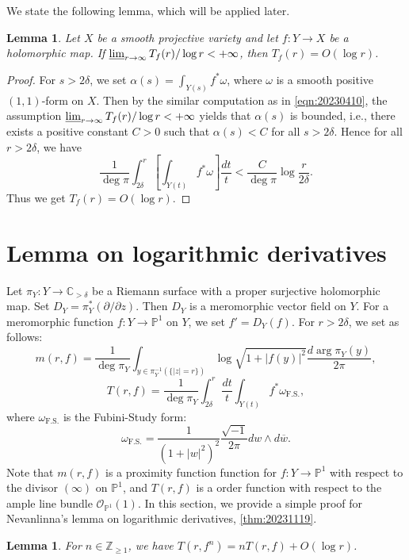 \documentclass[11pt,english]{smfart}
\theoremstyle{plain}
\newtheorem{lem}[thm]{Lemma}
\theoremstyle{definition}
\theoremstyle{remark}
\numberwithin{equation}{section}
\theoremstyle{plain}
\begin{document}
We state the following lemma, which will be applied later.
	
	\begin{lem}\label{lem:20230415}
		Let $X$ be a smooth projective variety and let $f:Y\to X$ be a holomorphic map.
		If $\varliminf_{r\to\infty}T_f(r)/\log r<+\infty$, then $T_f(r)=O(\log r)$.
	\end{lem}
	
	
	\begin{proof}
		For $s>2\delta$, we set $\alpha(s)=\int_{Y(s)}f^*\omega$, where $\omega$ is a smooth positive $(1,1)$-form on $X$.
		Then by the similar computation as in \eqref{eqn:20230410}, the assumption $\varliminf_{r\to\infty}T_f(r)/\log r<+\infty$ yields that $\alpha(s)$ is bounded, i.e., there exists a positive constant $C>0$ such that $\alpha(s)<C$ for all $s>2\delta$.
		Hence for all $r>2\delta$, we have
		$$
		\frac{1}{\operatorname{deg} \pi} \int_{2\delta}^{r}\left[\int_{Y(t)} f^{*}\omega\right] \frac{d t}{t}<\frac{C}{\operatorname{deg} \pi}\log \frac{r}{2\delta}.
		$$
		Thus we get $T_f(r)=O(\log r)$.
	\end{proof}
	
	
	
	\section{Lemma on logarithmic derivatives} \label{sec:20250904}
	Let $\pi _Y:Y\to \mathbb C_{>\delta}$ be a Riemann surface with a proper surjective holomorphic map.
	Set $D_Y=\pi_Y^*(\partial /\partial z)$.
	Then $D_Y$ is a meromorphic vector field on $Y$.
	For a meromorphic function $f:Y\to\mathbb P^1$ on $Y$, we set $f'=D_Y(f)$.
	For $r>2\delta$, we set as follows:
	$$
	m(r,f)=\frac{1}{\deg \pi_Y}\int_{y\in \pi_Y^{-1}(\{|z|=r\})}\log \sqrt{1+|f(y)|^2}\frac{d\arg \pi_Y(y)}{2\pi},
	$$
	$$
	T(r,f)=\frac{1}{\deg \pi_Y}\int_{2\delta}^r\frac{dt}{t}\int_{Y(t)}f^*\omega_{\mathrm{F.S.}},
	$$
	where $\omega_{\mathrm{F.S.}}$ is the Fubini-Study form:
	$$
	\omega_{\mathrm{F.S.}}=\frac{1}{(1+|w|^2)^2}\frac{\sqrt{-1}}{2\pi}dw\wedge d\overline{w}.
	$$
	Note that $m(r,f)$ is a proximity function function for $f:Y\to\mathbb P^1$ with respect to the divisor $(\infty)$ on  $\mathbb P^1$, and $
	T(r,f)$ is a order function with respect to the ample line bundle $\mathcal{O}_{\mathbb P^1}(1)$.
	In this section, we provide a simple proof for Nevanlinna's lemma on logarithmic derivatives, \cref{thm:20231119}.
	
	\begin{lem}\label{lem:202311191}
		For $n\in\mathbb Z_{\geq 1}$, we have
		$T(r,f^n)=nT(r,f)+O(\log r)$.
	\end{lem}
	
\end{document}
